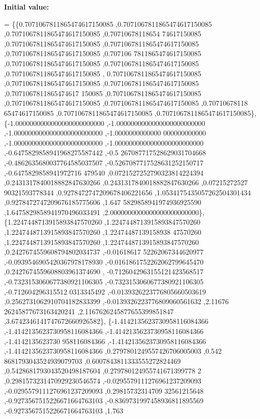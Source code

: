 {\bfseries Initial value\+:}
\begin{DoxyCode}
= \{\{0.7071067811865474617150085 ,0.7071067811865474617150085 ,0.7071067811865474617150085 ,0.70710678118654
      74617150085 ,0.7071067811865474617150085 ,0.7071067811865474617150085 ,0.7071067811865474617150085 ,0.707106
      7811865474617150085 ,0.7071067811865474617150085 ,0.7071067811865474617150085 ,0.7071067811865474617150085 ,
      0.7071067811865474617150085 ,0.7071067811865474617150085 ,0.7071067811865474617150085 ,0.7071067811865474617
      150085 ,0.7071067811865474617150085 ,0.7071067811865474617150085 ,0.7071067811865474617150085 ,0.70710678118
      65474617150085 ,0.7071067811865474617150085 ,0.7071067811865474617150085\},
\{-1.0000000000000000000000000 ,-1.0000000000000000000000000 ,-1.0000000000000000000000000 ,-1.0000000000000
      000000000000 ,-1.0000000000000000000000000 ,-1.0000000000000000000000000 ,-0.6475829858941968275587442 ,-0.5
      267087717528629031704668 ,-0.4862635680037764585037507 ,-0.5267087717528631252150717 ,-0.6475829858941972716
      479540 ,0.0721527252790323814224394 ,0.2431317840018882847630266 ,0.2431317840018882847630266 ,0.07215272527
      90321593778344 ,0.9278472747209678406221656 ,1.0534175435057262504301434 ,0.9278472747209676185775606 ,1.647
      5829858941974936925590 ,1.6475829858941970496033491 ,2.0000000000000000000000000\},
\{1.2247448713915893847570260 ,1.2247448713915893847570260 ,1.2247448713915893847570260 ,1.22474487139158938
      47570260 ,1.2247448713915893847570260 ,1.2247448713915893847570260 ,0.2427674559608794802034737 ,-0.01618617
      52262067344620977 ,-0.0939546905420367978178930 ,-0.0161861752262062799645470 ,0.2427674559608803961374690 ,
      -0.7126042963155121423568517 ,-0.7323153060677380921106305 ,-0.7323153060677380921106305 ,-0.712604296315512
      0313345492 ,-0.0139326223776805660503619 ,0.2562731062910704182833399 ,-0.0139326223776809060561632 ,2.11676
      26245877673163420241 ,2.1167626245877655399851847 ,3.6742346141747672660926582\},
\{-1.4142135623730958116084366 ,-1.4142135623730958116084366 ,-1.4142135623730958116084366 ,-1.4142135623730
      958116084366 ,-1.4142135623730958116084366 ,-1.4142135623730958116084366 ,0.2797801249557426706005003 ,0.542
      8681793043524939079703 ,0.6007843811333555272824469 ,0.5428681793043520498187604 ,0.279780124955741671399778
      2 ,0.2981573231470929230546574 ,-0.0295579111276961237209093 ,-0.0295579111276961237209093 ,0.29815732314709
      32561215648 ,-0.9273567515226671664763103 ,-0.8369731997458936811895569 ,-0.9273567515226671664763103 ,1.763

\end{DoxyCode}
